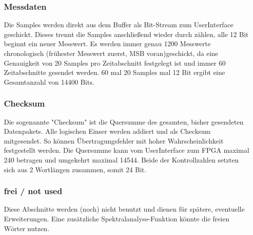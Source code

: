 \subsubsection{Messdaten}
Die Samples werden direkt aus dem Buffer als Bit-Stream zum UserInterface geschickt. Dieses trennt die Samples anschließend wieder durch zählen, alle 12 Bit beginnt ein neuer Messwert. Es werden immer genau 1200 Messwerte chronologisch (frühester Messwert zuerst, MSB voran)geschickt, da eine Genauigkeit von 20 Samples pro Zeitabschnitt festgelegt ist und immer 60 Zeitabschnitte gesendet werden. 60 mal 20 Samples mal 12 Bit ergibt eine Gesamtanzahl von 14400 Bits.
\subsubsection{Checksum}
Die sogenannte "Checksum" ist die Quersumme des gesamten, bisher gesendeten Datenpakets. Alle logischen Einser werden addiert und als Checksum mitgesendet. So können Übertragungsfehler mit hoher Wahrscheinlichkeit festgestellt werden. Die Quersumme kann vom UserInterface zum FPGA maximal 240 betragen und umgekehrt maximal 14544. Beide der Kontrollzahlen setzten sich aus 2 Wortlängen zusammen, somit 24 Bit.
\subsubsection{frei / not used}
Diese Abschnitte werden (noch) nicht benutzt und dienen für spätere, eventuelle Erweiterungen. Eine zusätzliche Spektralanalyse-Funktion könnte die freien Wörter nutzen.
